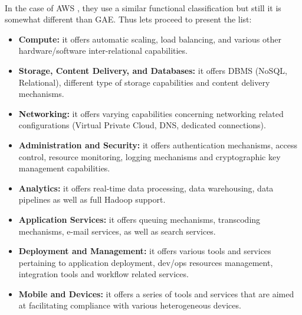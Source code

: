 \documentclass[11pt]{amsart}
\begin{document}
\begin{enumarate}
          \\ In the case of AWS \cite{AWS}, they use a similar functional classification but still it
          is somewhat different than GAE. Thus lets proceed to present the list:
          \begin{itemize}
          \item \textbf{Compute:} it offers automatic scaling, load balancing, and various
            other hardware/software inter-relational capabilities.
          \item \textbf{Storage, Content Delivery, and Databases:} it offers DBMS (NoSQL,
            Relational), different type of storage capabilities and content delivery mechanisms.
          \item \textbf{Networking:} it offers varying capabilities concerning networking
            related configurations (Virtual Private Cloud, DNS, dedicated connections).
          \item \textbf{Administration and Security:} it offers authentication mechanisms,
            access control, resource monitoring, logging mechanisms and cryptographic key
            management capabilities.
          \item \textbf{Analytics:} it offers real-time data processing, data warehousing,
            data pipelines as well as full Hadoop support. 
          \item \textbf{Application Services:} it offers queuing mechanisms, transcoding
            mechanisms, e-mail services, as well as search services.
          \item \textbf{Deployment and Management:} it offers various tools and services
            pertaining to application deployment, dev/ops resources management,
            integration tools and workflow related services.
          \item \textbf{Mobile and Devices:} it offers a series of tools and services that
            are aimed at facilitating compliance with various heterogeneous devices.
          \end{itemize}


\end{enumarate}
\end{document}
